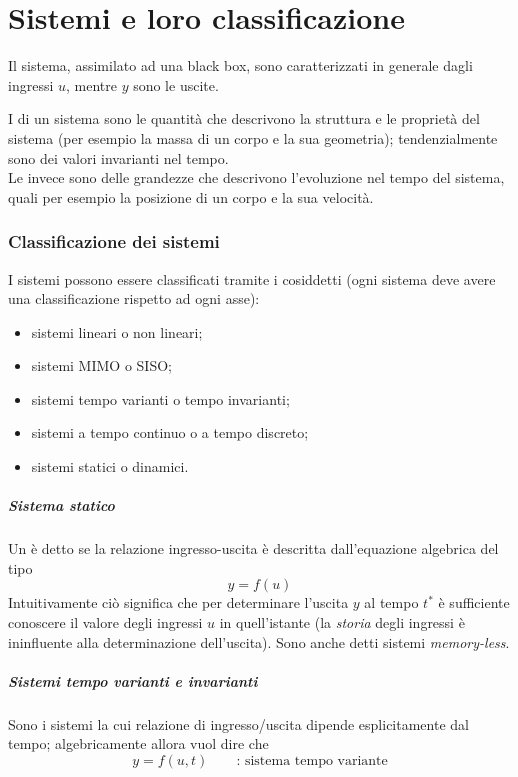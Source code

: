 \chapter{Sistemi e loro classificazione}
	Il sistema, assimilato ad una black box, sono caratterizzati in generale dagli ingressi $u$, mentre $y$ sono le uscite.
	
	I  di un sistema sono le quantità che descrivono la struttura e le proprietà del sistema (per esempio la massa di un corpo e la sua geometria); tendenzialmente sono dei valori invarianti nel tempo.	 \\ 
	Le  invece sono delle grandezze che descrivono l'evoluzione nel tempo del sistema, quali per esempio la posizione di un corpo e la sua velocità.
	
	
	\subsection*{Classificazione dei sistemi} 
	I sistemi possono essere classificati tramite i cosiddetti  (ogni sistema deve avere una classificazione rispetto ad ogni asse):
	\begin{itemize}
		\item sistemi lineari o non lineari;
		\item sistemi MIMO o SISO;
		\item sistemi tempo varianti o tempo invarianti;
		\item sistemi a tempo continuo o a tempo discreto;
		\item sistemi statici o dinamici.
 	\end{itemize}
 	
 	\paragraph{Sistema statico} Un  è detto  se la relazione ingresso-uscita  è descritta dall'equazione algebrica del tipo
 	\[ y = f(u)  \]
 	Intuitivamente ciò significa che per determinare l'uscita $y$ al tempo $t^*$ è sufficiente conoscere il valore degli ingressi $u$ in quell'istante (la \textit{storia} degli ingressi è ininfluente alla determinazione dell'uscita). Sono anche detti sistemi \textit{memory-less}.
 	
 	\paragraph{Sistemi tempo varianti e invarianti} Sono  i sistemi la cui relazione di ingresso/uscita dipende esplicitamente dal tempo; algebricamente allora vuol dire che
 	\[ y = f(u,t) \qquad \textrm{: sistema tempo variante} \]
 	
